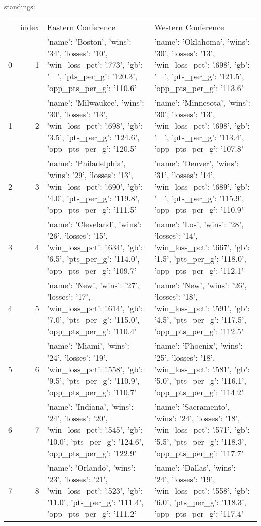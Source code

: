{} standings:
\begin{tabular}{lrll}
 & index & Eastern Conference & Western Conference \\
0 & 1 & {'name': 'Boston', 'wins': '34', 'losses': '10', 'win_loss_pct': '.773', 'gb': '—', 'pts_per_g': '120.3', 'opp_pts_per_g': '110.6'} & {'name': 'Oklahoma', 'wins': '30', 'losses': '13', 'win_loss_pct': '.698', 'gb': '—', 'pts_per_g': '121.5', 'opp_pts_per_g': '113.6'} \\
1 & 2 & {'name': 'Milwaukee', 'wins': '30', 'losses': '13', 'win_loss_pct': '.698', 'gb': '3.5', 'pts_per_g': '124.6', 'opp_pts_per_g': '120.5'} & {'name': 'Minnesota', 'wins': '30', 'losses': '13', 'win_loss_pct': '.698', 'gb': '—', 'pts_per_g': '113.4', 'opp_pts_per_g': '107.8'} \\
2 & 3 & {'name': 'Philadelphia', 'wins': '29', 'losses': '13', 'win_loss_pct': '.690', 'gb': '4.0', 'pts_per_g': '119.8', 'opp_pts_per_g': '111.5'} & {'name': 'Denver', 'wins': '31', 'losses': '14', 'win_loss_pct': '.689', 'gb': '—', 'pts_per_g': '115.9', 'opp_pts_per_g': '110.9'} \\
3 & 4 & {'name': 'Cleveland', 'wins': '26', 'losses': '15', 'win_loss_pct': '.634', 'gb': '6.5', 'pts_per_g': '114.0', 'opp_pts_per_g': '109.7'} & {'name': 'Los', 'wins': '28', 'losses': '14', 'win_loss_pct': '.667', 'gb': '1.5', 'pts_per_g': '118.0', 'opp_pts_per_g': '112.1'} \\
4 & 5 & {'name': 'New', 'wins': '27', 'losses': '17', 'win_loss_pct': '.614', 'gb': '7.0', 'pts_per_g': '115.0', 'opp_pts_per_g': '110.4'} & {'name': 'New', 'wins': '26', 'losses': '18', 'win_loss_pct': '.591', 'gb': '4.5', 'pts_per_g': '117.5', 'opp_pts_per_g': '112.5'} \\
5 & 6 & {'name': 'Miami', 'wins': '24', 'losses': '19', 'win_loss_pct': '.558', 'gb': '9.5', 'pts_per_g': '110.9', 'opp_pts_per_g': '110.7'} & {'name': 'Phoenix', 'wins': '25', 'losses': '18', 'win_loss_pct': '.581', 'gb': '5.0', 'pts_per_g': '116.1', 'opp_pts_per_g': '114.2'} \\
6 & 7 & {'name': 'Indiana', 'wins': '24', 'losses': '20', 'win_loss_pct': '.545', 'gb': '10.0', 'pts_per_g': '124.6', 'opp_pts_per_g': '122.9'} & {'name': 'Sacramento', 'wins': '24', 'losses': '18', 'win_loss_pct': '.571', 'gb': '5.5', 'pts_per_g': '118.3', 'opp_pts_per_g': '117.7'} \\
7 & 8 & {'name': 'Orlando', 'wins': '23', 'losses': '21', 'win_loss_pct': '.523', 'gb': '11.0', 'pts_per_g': '111.4', 'opp_pts_per_g': '111.2'} & {'name': 'Dallas', 'wins': '24', 'losses': '19', 'win_loss_pct': '.558', 'gb': '6.0', 'pts_per_g': '118.3', 'opp_pts_per_g': '117.4'} \\

\end{tabular}
